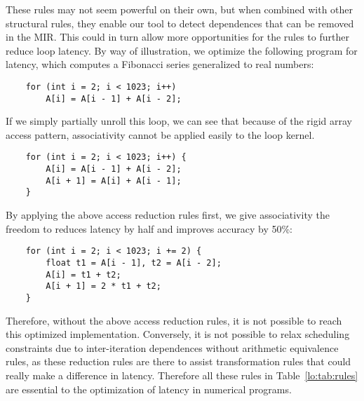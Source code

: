 These rules may not seem powerful on their own, but when combined with other
structural rules, they enable our tool to detect dependences that can be
removed in the MIR\@.  This could in turn allow more opportunities for the
rules to further reduce loop latency.  By way of illustration, we optimize the
following program for latency, which computes a Fibonacci series generalized to
real numbers:
\begin{lstlisting}
    for (int i = 2; i < 1023; i++)
        A[i] = A[i - 1] + A[i - 2];
\end{lstlisting}
If we simply partially unroll this loop, we can see that because of the
rigid array access pattern, associativity cannot be applied easily to the
loop kernel.
\begin{lstlisting}
    for (int i = 2; i < 1023; i++) {
        A[i] = A[i - 1] + A[i - 2];
        A[i + 1] = A[i] + A[i - 1];
    }
\end{lstlisting}
By applying the above access reduction rules first, we give associativity the
freedom to reduces latency by half and improves accuracy by 50\%:
\begin{lstlisting}
    for (int i = 2; i < 1023; i += 2) {
        float t1 = A[i - 1], t2 = A[i - 2];
        A[i] = t1 + t2;
        A[i + 1] = 2 * t1 + t2;
    }
\end{lstlisting}
Therefore, without the above access reduction rules, it is not possible to
reach this optimized implementation.  Conversely, it is not possible to relax
scheduling constraints due to inter-iteration dependences without arithmetic
equivalence rules, as these reduction rules are there to assist transformation
rules that could really make a difference in latency.  Therefore all these
rules in Table~\ref{lo:tab:rules} are essential to the optimization of latency
in numerical programs.
